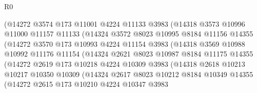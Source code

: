 \begin{lexlean}{R0}
\begin{coremodule}
                      (@14272
                        @3574
                        @173
                        @11001
                        @4224
                        @11133
                        @3983
                        (@14318
                          @3573
                          @10996
                          @11000
                          @11157
                          @11133
                          (@14324
                            @3572
                            @8023
                            @10995
                            @8184
                            @11156
                            @14355
                            (@14272
                              @3570
                              @173
                              @10993
                              @4224
                              @11154
                              @3983
                              (@14318
                                @3569
                                @10988
                                @10992
                                @11176
                                @11154
                                (@14324
                                  @2621
                                  @8023
                                  @10987
                                  @8184
                                  @11175
                                  @14355
                                  (@14272
                                    @2619
                                    @173
                                    @10218
                                    @4224
                                    @10309
                                    @3983
                                    (@14318
                                      @2618
                                      @10213
                                      @10217
                                      @10350
                                      @10309
                                      (@14324
                                        @2617
                                        @8023
                                        @10212
                                        @8184
                                        @10349
                                        @14355
                                        (@14272
                                          @2615
                                          @173
                                          @10210
                                          @4224
                                          @10347
                                          @3983

\end{coremodule}
\end{lexlean}
